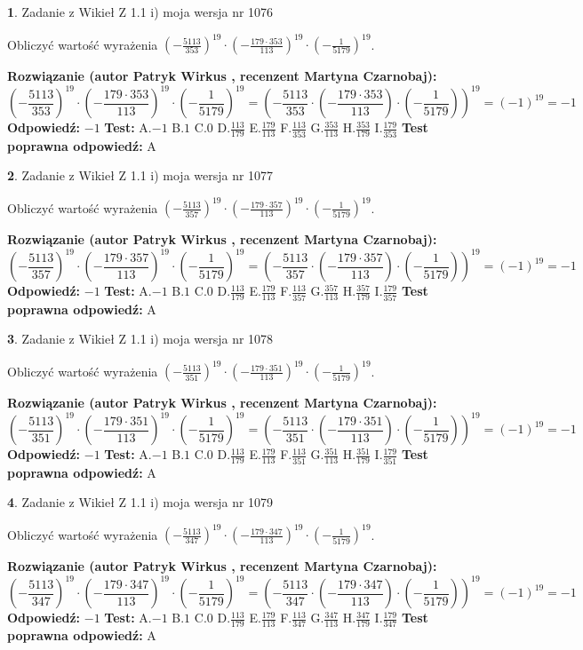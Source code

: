 \documentclass[12pt, a4paper]{article}
\theoremstyle{definition} %
\newtheorem{zad}{}
\newcommand{\zadStart}[1]{\begin{zad}#1\newline}
\newcommand{\zadStop}{\end{zad}}
\newcommand{\rozwStart}[2]{\noindent \textbf{Rozwiązanie (autor #1 , recenzent #2): }\newline}
\newcommand{\rozwStop}{\newline}
\newcommand{\odpStart}{\noindent \textbf{Odpowiedź:}\newline}
\newcommand{\odpStop}{\newline}
\newcommand{\testStart}{\noindent \textbf{Test:}\newline}
\newcommand{\testStop}{\newline}
\newcommand{\kluczStart}{\noindent \textbf{Test poprawna odpowiedź:}\newline}
\newcommand{\kluczStop}{\newline}
\begin{document}
\zadStart{Zadanie z Wikieł Z 1.1 i) moja wersja nr 1076}

Obliczyć wartość wyrażenia $(-\frac{5113}{353})^{19} \cdot (-\frac{179 \cdot 353}{113})^{19} \cdot (-\frac{1}{5179})^{19}$.
\zadStop
\rozwStart{Patryk Wirkus}{Martyna Czarnobaj}
$$(-\frac{5113}{353})^{19} \cdot (-\frac{179 \cdot 353}{113})^{19} \cdot (-\frac{1}{5179})^{19} = (-\frac{5113}{353} \cdot (-\frac{179 \cdot 353}{113}) \cdot (-\frac{1}{5179}))^{19} = (-1)^{19} = -1$$
\rozwStop
\odpStart
$-1$
\odpStop
\testStart
A.$-1$ B.$1$ C.$0$ D.$\frac{113}{179}$ E.$\frac{179}{113}$
F.$\frac{113}{353}$ G.$\frac{353}{113}$
H.$\frac{353}{179}$
I.$\frac{179}{353}$
\testStop
\kluczStart
A
\kluczStop



\zadStart{Zadanie z Wikieł Z 1.1 i) moja wersja nr 1077}

Obliczyć wartość wyrażenia $(-\frac{5113}{357})^{19} \cdot (-\frac{179 \cdot 357}{113})^{19} \cdot (-\frac{1}{5179})^{19}$.
\zadStop
\rozwStart{Patryk Wirkus}{Martyna Czarnobaj}
$$(-\frac{5113}{357})^{19} \cdot (-\frac{179 \cdot 357}{113})^{19} \cdot (-\frac{1}{5179})^{19} = (-\frac{5113}{357} \cdot (-\frac{179 \cdot 357}{113}) \cdot (-\frac{1}{5179}))^{19} = (-1)^{19} = -1$$
\rozwStop
\odpStart
$-1$
\odpStop
\testStart
A.$-1$ B.$1$ C.$0$ D.$\frac{113}{179}$ E.$\frac{179}{113}$
F.$\frac{113}{357}$ G.$\frac{357}{113}$
H.$\frac{357}{179}$
I.$\frac{179}{357}$
\testStop
\kluczStart
A
\kluczStop



\zadStart{Zadanie z Wikieł Z 1.1 i) moja wersja nr 1078}

Obliczyć wartość wyrażenia $(-\frac{5113}{351})^{19} \cdot (-\frac{179 \cdot 351}{113})^{19} \cdot (-\frac{1}{5179})^{19}$.
\zadStop
\rozwStart{Patryk Wirkus}{Martyna Czarnobaj}
$$(-\frac{5113}{351})^{19} \cdot (-\frac{179 \cdot 351}{113})^{19} \cdot (-\frac{1}{5179})^{19} = (-\frac{5113}{351} \cdot (-\frac{179 \cdot 351}{113}) \cdot (-\frac{1}{5179}))^{19} = (-1)^{19} = -1$$
\rozwStop
\odpStart
$-1$
\odpStop
\testStart
A.$-1$ B.$1$ C.$0$ D.$\frac{113}{179}$ E.$\frac{179}{113}$
F.$\frac{113}{351}$ G.$\frac{351}{113}$
H.$\frac{351}{179}$
I.$\frac{179}{351}$
\testStop
\kluczStart
A
\kluczStop



\zadStart{Zadanie z Wikieł Z 1.1 i) moja wersja nr 1079}

Obliczyć wartość wyrażenia $(-\frac{5113}{347})^{19} \cdot (-\frac{179 \cdot 347}{113})^{19} \cdot (-\frac{1}{5179})^{19}$.
\zadStop
\rozwStart{Patryk Wirkus}{Martyna Czarnobaj}
$$(-\frac{5113}{347})^{19} \cdot (-\frac{179 \cdot 347}{113})^{19} \cdot (-\frac{1}{5179})^{19} = (-\frac{5113}{347} \cdot (-\frac{179 \cdot 347}{113}) \cdot (-\frac{1}{5179}))^{19} = (-1)^{19} = -1$$
\rozwStop
\odpStart
$-1$
\odpStop
\testStart
A.$-1$ B.$1$ C.$0$ D.$\frac{113}{179}$ E.$\frac{179}{113}$
F.$\frac{113}{347}$ G.$\frac{347}{113}$
H.$\frac{347}{179}$
I.$\frac{179}{347}$
\testStop
\kluczStart
A
\kluczStop
\end{document}
